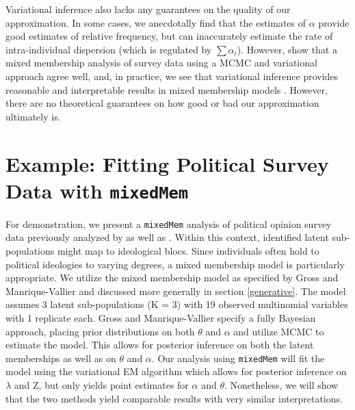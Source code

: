 \documentclass{article}\usepackage[]{graphicx}\usepackage[]{color}
\begin{document}
Variational inference also lacks any guarantees on the quality of our approximation. In some cases, we anecdotally find that the estimates of $\alpha$ provide good estimates of relative frequency, but can inaccurately estimate the rate of intra-individual dispersion (which is regulated by $\sum \alpha_i$). However, \cite{erosheva2007describing} show that a mixed membership analysis of survey data using a MCMC and variational approach agree well, and, in practice, we see that variational inference provides reasonable and interpretable results in mixed membership models \citep{LDA, erosheva2004mixed, airoldi2009mixed}. However, there are no theoretical guarantees on how good or bad our approximation ultimately is.

\section{Example: Fitting Political Survey Data with \texttt{mixedMem}} \label{politicalSurvey}
For demonstration, we present a \texttt{mixedMem} analysis of political opinion survey data previously analyzed by  \cite{grossManriqueVallier} as well as \cite{feldman1988structure}. Within this context, identified latent sub-populations might map to ideological blocs. Since individuals often hold to political ideologies to varying degrees, a mixed membership model is particularly appropriate. We utilize the mixed membership model as specified by Gross and Manrique-Vallier and discussed more generally in section \ref{generative}. The model assumes 3 latent sub-populations (K = 3) with 19 observed multinomial variables with 1 replicate each. Gross and Manrique-Vallier specify a fully Bayesian approach, placing prior distributions on both $\theta$ and $\alpha$ and utilize MCMC to estimate the model. This allows for posterior inference on both the latent memberships as well as on $\theta$ and $\alpha$. Our analysis using \texttt{mixedMem} will fit the model using the variational EM algorithm  which allows for posterior inference on $\lambda$ and Z, but only yields point estimates for $\alpha$ and $\theta$. Nonetheless, we will show that the two methods yield comparable results with very similar interpretations.
\end{document}
